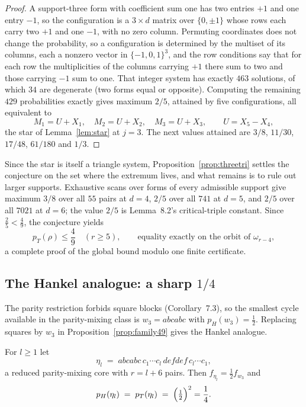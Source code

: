 \begin{proof}
A support-three form with coefficient sum one has two entries $+1$ and
one entry $-1$, so the configuration is a $3\times d$ matrix over
$\{0,\pm1\}$ whose rows each carry two $+1$ and one $-1$, with no zero
column.  Permuting coordinates does not change the probability, so a
configuration is determined by the multiset of its columns, each a
nonzero vector in $\{-1,0,1\}^3$, and the row conditions say that for
each row the multiplicities of the columns carrying $+1$ there sum to
two and those carrying $-1$ sum to one.  That integer system has exactly
$463$ solutions, of which $34$ are degenerate (two forms equal or
opposite).  Computing the remaining $429$ probabilities exactly gives
maximum $2/5$, attained by five configurations, all equivalent to
\[
M_1=U+X_1,\quad M_2=U+X_2,\quad M_3=U+X_3,\qquad U=X_5-X_4 ,
\]
the star of Lemma~\ref{lem:star} at $j=3$.  The next values attained are
$3/8$, $11/30$, $17/48$, $61/180$ and $1/3$.
\end{proof}

Since the star is itself a triangle system,
Proposition~\ref{prop:threetri} settles the conjecture on the set where
the extremum lives, and what remains is to rule out larger supports.
Exhaustive scans over forms of every admissible support give maximum
$3/8$ over all $55$ pairs at $d=4$, $2/5$ over all $741$ at $d=5$, and
$2/5$ over all $7021$ at $d=6$; the value $2/5$ is Lemma~8.2's
critical-triple constant.  Since $\tfrac25<\tfrac49$, the conjecture
yields
\[
p_T(\rho)\le\frac49\quad(r\ge5),\qquad
\text{equality exactly on the orbit of }\omega_{r-4},
\]
a complete proof of the global bound modulo one finite certificate.

\subsection*{The Hankel analogue: a sharp $1/4$}

The parity restriction forbids square blocks (Corollary~7.3), so the
smallest cycle available in the parity-mixing class is $w_3=abcabc$ with
$p_H(w_3)=\tfrac12$.  Replacing squares by $w_3$ in
Proposition~\ref{prop:family49} gives the Hankel analogue.

\begin{proposition}\label{prop:family14}
For $l\ge1$ let
\[
\eta_l\;=\;abcabc\,c_1\cdots c_l\,defdef\,c_l\cdots c_1 ,
\]
a reduced parity-mixing core with $r=l+6$ pairs.  Then
$f_{\eta_l}=\tfrac12 f_{w_3}$ and
\[
p_H(\eta_l)\;=\;p_T(\eta_l)\;=\;\Bigl(\tfrac12\Bigr)^2=\frac14 .
\]
\end{proposition}

